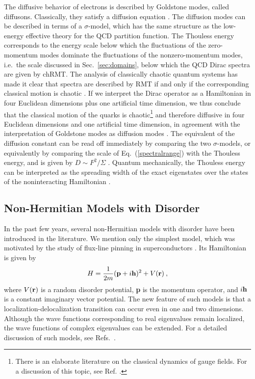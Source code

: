 The diffusive behavior of electrons is described by Goldstone modes,
called diffusons.  Classically, they satisfy a diffusion equation
\cite{Altshuler,Stone,Efetov}. The diffusion modes can be described in
terms of a $\sigma$-model, which has the same structure as the
low-energy effective theory for the QCD partition function. The
Thouless energy corresponds to the energy scale below which the
fluctuations of the zero-momentum modes dominate the fluctuations of
the nonzero-momentum modes, i.e.\ the scale discussed in
Sec.~\ref{sec:domains}, below which the QCD Dirac spectra are given by
chRMT. The analysis of classically chaotic quantum systems 
has made it clear that spectra are described by RMT if and only if the
corresponding classical motion is chaotic \cite{Bohi84,Seli84}.  If we
interpret the Dirac operator as a Hamiltonian in four Euclidean
dimensions plus one artificial time dimension, we thus
conclude that the classical motion of the quarks is
chaotic\footnote{There is an elaborate literature on the classical
  dynamics of gauge fields. For a discussion of this topic, see
  Ref. \cite{Biro}.}  \cite{Vminn} and therefore diffusive in four
Euclidean dimensions and one artificial time dimension, in agreement
with the interpretation of Goldstone modes as diffusion modes
\cite{Stone,Polonyi}. The equivalent of the diffusion constant can be
read off immediately by comparing the two $\sigma$-models, or
equivalently by comparing the scale of Eq.~(\ref{spectralrange}) with the
Thouless energy, and is given by $D \sim F^2/\Sigma$
\cite{Osbo98a,Jani98}.  Quantum mechanically, the Thouless energy can
be interpreted as the spreading width of the exact eigenstates over
the states of the noninteracting Hamiltonian \cite{spreading,Guhra}.


\subsection{Non-Hermitian Models with Disorder}

In the past few years, several non-Hermitian models with disorder have
been introduced in the literature. We mention only the simplest model,
which was motivated by the study of flux-line pinning in
superconductors \cite{Miller,Hata96}. Its Hamiltonian is given by
\begin{equation}
  \label{HN}
  H=\frac{1}{2m}({\bf p}+i{\bf h})^2+V({\bf r})\:,
\end{equation}
where $V({\bf r})$ is a random disorder potential, {\bf p} is the
momentum operator, and $i{\bf h}$ is a constant imaginary vector
potential.  The new feature of such models is that a
localization-delocalization transition can occur even in one and two
dimensions.  Although the wave functions corresponding to real
eigenvalues remain localized, the wave functions of complex
eigenvalues can be extended. For a detailed discussion of such models,
see Refs.~\cite{Fein,piet}.

